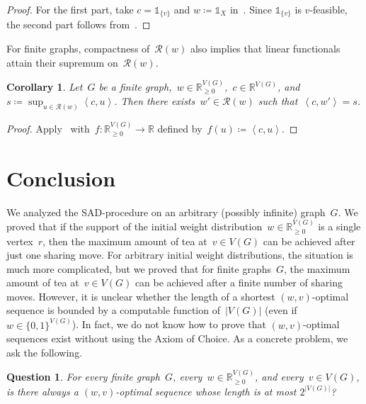 \documentclass[reqno, 12pt]{amsart}
\numberwithin{equation}{section}
\numberwithin{figure}{section}
\theoremstyle{plain}
\newtheorem{corollary}[thm]{Corollary}
\newtheorem{question}[thm]{Question}
\theoremstyle{definition}
\newcommand*{\abs}[1]{\ensuremath{{\left\lvert {#1} \right\rvert}}}
\newcommand*{\gen}[1]{\ensuremath{{\left\langle {#1} \right\rangle}}}
\newcommand*{\weights}{\ensuremath{\mathbb{R}_{\geq 0}^{V(G)}}}
\begin{document}
\begin{proof}
    For the first part, take $c=\mathds{1}_{\{v\}}$ and ${w  \coloneqq \mathds{1}_X}$ in~.  Since $\mathds{1}_{\{v\}}$ is $v$-feasible, the second part follows from~.  
\end{proof}

For finite graphs, compactness of~${\mathcal{R}(w)}$ also implies that linear functionals attain their supremum on~${\mathcal{R}(w)}$.

\begin{corollary}
    Let~$G$ be a finite graph,~${w \in \weights}$,~${c \in \mathbb{R}^{V(G)}}$, and~${s \coloneqq \sup_{u \in \mathcal{R}(w)} \gen{c,u}}$.  
    Then there exists~${w' \in \mathcal{R}(w)}$ such that~${\gen{c,w'} = s}$. 
\end{corollary}

\begin{proof}
        Apply~ with~${f \colon \weights \to \mathbb{R}}$ defined by~${f(u) \coloneqq \gen{c,u}}$.
\end{proof}




\section{Conclusion}
\label{sec:discussions}

We analyzed the SAD-procedure on an arbitrary (possibly infinite) graph~$G$. 
We proved that if the support of the initial weight distribution~${w \in \weights}$ is a single vertex~$r$, then the maximum amount of tea at~${v \in V(G)}$ can be achieved after just one sharing move. 
For arbitrary initial weight distributions, the situation is much more complicated, but we proved that for finite graphs~$G$, the maximum amount of tea at~${v \in V(G)}$ can be achieved after a finite number of sharing moves. 
However, it is unclear whether the length of a shortest ${(w,v)}$-optimal sequence is bounded by a computable function of~$\abs{V(G)}$ (even if~${w \in \{0,1\}^{V(G)}}$). 
In fact, we do not know how to prove that $(w,v)$-optimal sequences exist without using the Axiom of Choice. 
As a concrete problem, we ask the following.

\begin{question}
    \label{quest:finite}
    For every finite graph~$G$, every~${w \in \weights}$, and every~${v \in V(G)}$, is there always a ${(w,v)}$-optimal sequence whose length is at most $2^{\abs{V(G)}}$?
\end{question}
\end{document}
